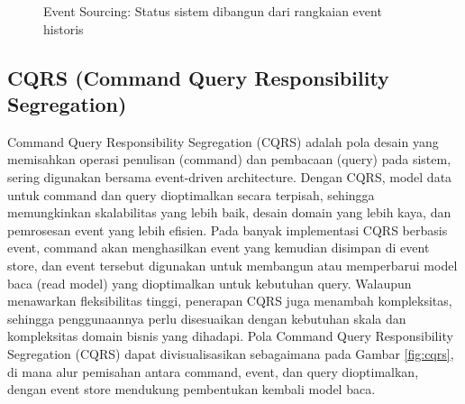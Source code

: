 \begin{figure}[h]
	\centering
	\caption{Event Sourcing: Status sistem dibangun dari rangkaian event historis}
	\label{fig:event-sourcing}
\end{figure}



\subsection{CQRS (Command Query Responsibility Segregation)}
Command Query Responsibility Segregation (CQRS) adalah pola desain yang memisahkan operasi penulisan (command) dan pembacaan (query) pada sistem, sering digunakan bersama event-driven architecture. Dengan CQRS, model data untuk command dan query dioptimalkan secara terpisah, sehingga memungkinkan skalabilitas yang lebih baik, desain domain yang lebih kaya, dan pemrosesan event yang lebih efisien. Pada banyak implementasi CQRS berbasis event, command akan menghasilkan event yang kemudian disimpan di event store, dan event tersebut digunakan untuk membangun atau memperbarui model baca (read model) yang dioptimalkan untuk kebutuhan query. Walaupun menawarkan fleksibilitas tinggi, penerapan CQRS juga menambah kompleksitas, sehingga penggunaannya perlu disesuaikan dengan kebutuhan skala dan kompleksitas domain bisnis yang dihadapi. Pola Command Query Responsibility Segregation (CQRS) dapat divisualisasikan sebagaimana pada Gambar \ref{fig:cqrs}, di mana alur pemisahan antara command, event, dan query dioptimalkan, dengan event store mendukung pembentukan kembali model baca.

